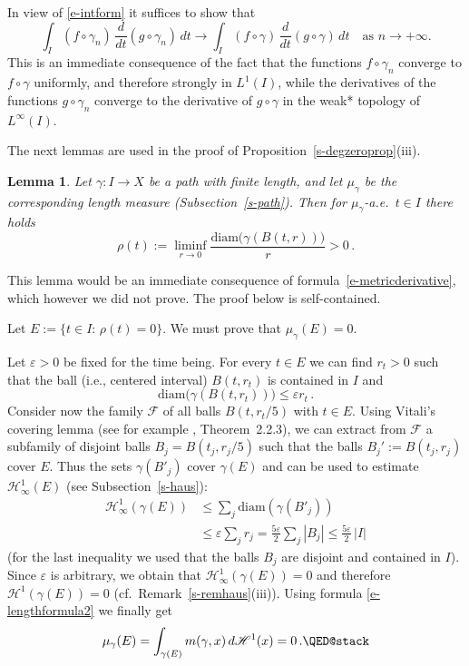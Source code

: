\documentclass[11pt,reqno,a4paper,final]{amsart}
\makeatletter
\numberwithin{equation}{section}
\theoremstyle{mytheorem}
\newtheorem{lemma}[subsection]{Lemma}
\theoremstyle{myremark}
\theoremstyle{myparagraph}
\renewenvironment{proof}[1][\proofname]{\par 
  \pushQED{\qed}%
  \normalfont \topsep10\p@\@plus6\p@\relax 
  \trivlist 
  \item[\hskip\labelsep 
    \bfseries 
    #1\@addpunct{.}]\ignorespaces 
}{%
  \popQED\endtrivlist\@endpefalse 
}
\providecommand{\proofname}{Proof}
\newcommand{\F}{\mathscr{F}}
\newcommand{\Haus}{\mathscr{H}}
\newcommand{\eps}{\varepsilon}
\newcommand{\diam}{\mathrm{diam}}
\makeatother
\begin{document}
\begin{proof}[Proof of Proposition~\ref{s-degzeroprop}(ii)]
In view of \eqref{e-intform} it suffices to show that 
\[
\int_I (f \circ \gamma_n) \, \frac{d}{dt} (g\circ\gamma_n) \, dt
\to
\int_I (f \circ \gamma) \, \frac{d}{dt} (g\circ\gamma) \, dt
\quad\text{as $n\to+\infty$.}
\]
This is an immediate consequence of the fact that the functions
$f \circ \gamma_n$ converge to $f \circ \gamma$ uniformly, 
and therefore strongly in $L^1(I)$,
while the derivatives of the functions $g\circ\gamma_n$ converge 
to the derivative of $g\circ\gamma$
in the weak* topology of $L^\infty(I)$. 
\end{proof}


The next lemmas are used in the proof of Proposition~\ref{s-degzeroprop}(iii).


\begin{lemma}
\label{s-quasimetricderiv}
Let $\gamma:I\to X$ be a path with finite length, and let 
$\mu_\gamma$ be the corresponding length measure (Subsection~\ref{s-path}).
Then for $\mu_\gamma$-a.e.~$t\in I$ there holds
%
\begin{equation}
\label{e-quasimetricderiv}
\rho(t):=\liminf_{r\to 0} \frac{ \diam\big( \gamma(B(t,r)) \big) }{ r } >0
\, .
\end{equation}
%
\end{lemma}

This lemma would be an immediate consequence of formula~\eqref{e-metricderivative}, 
which however we did not prove. The proof below is self-contained.

\begin{proof}
Let $E := \{t\in I: \, \rho(t)=0\}$.
We must prove that $\mu_\gamma(E)=0$.

Let $\eps>0$ be fixed for the time being.
For every $t\in E$ we can find $r_t>0$ such that 
the ball (i.e., centered interval) $B(t,r_t)$ 
is contained in $I$ and
\[
\diam\big( \gamma(B(t,r_t)) \big) \le \eps r_t
\, .
\]
Consider now the family $\F$ of all balls $B(t,r_t/5)$ with $t\in E$. 
Using Vitali's covering lemma (see for example \cite{AT}, 
Theorem~2.2.3), we can extract from $\F$
a subfamily of disjoint balls $B_j=B(t_j,r_j/5)$ 
such that the balls $B_j':=B(t_j,r_j)$ cover $E$. 
Thus the sets $\gamma(B'_j)$ cover $\gamma(E)$ and
can be used to estimate $\Haus^1_\infty(E)$ (see Subsection~\ref{s-haus}):
%
\begin{align*}
      \Haus^1_\infty(\gamma(E)) 
& \le \sum_j \diam(\gamma(B'_j)) \\
& \le \eps \sum_j r_j 
  = \frac{5\eps}{2} \sum_j |B_j|
  \le \frac{5\eps}{2} \,|I|
\end{align*}
%
(for the last inequality we used that the balls $B_j$ are disjoint
and contained in $I$).
Since $\eps$ is arbitrary, we obtain that $\Haus^1_\infty(\gamma(E))=0$ and
therefore $\Haus^1(\gamma(E))=0$ (cf.~Remark~\ref{s-remhaus}(iii)).
Using formula \eqref{e-lengthformula2} we finally get 
\[
\mu_\gamma(E) = \int_{\gamma(E)} m(\gamma,x)\, d\Haus^1(x) = 0
\, .
\qedhere
\]
\end{proof}
\end{document}
